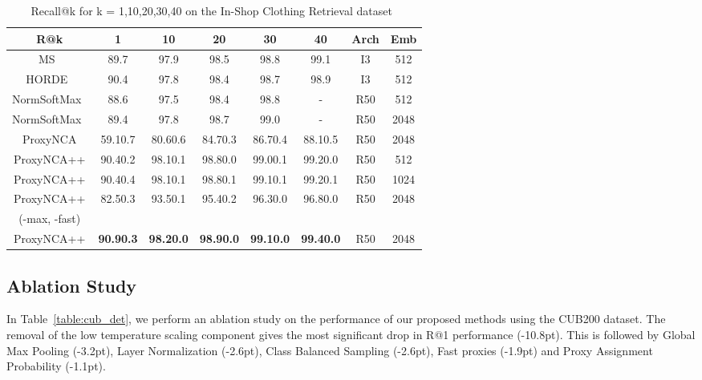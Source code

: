 \documentclass[runningheads]{llncs}
\begin{document}
\begin{table}[htb]
\centering
\caption{Recall@k for k = 1,10,20,30,40 on the In-Shop Clothing Retrieval dataset~\cite{song2016deep}}
\setlength{\tabcolsep}{2pt}
\begin{tabular}{|*8c|}
\hline
R@k & 1 & 10 & 20 & 30 & 40 &  Arch & Emb \\ \hline
\small{MS~\cite{wang2019multi}}& 89.7 & 97.9 & 98.5 & 98.8 & 99.1 & \small{I3}& \small{512}\\
\small{HORDE~\cite{jacob2019metric}}& 90.4 & 97.8 & 98.4 & 98.7 & 98.9 &  \small{I3}& \small{512}\\
\small{NormSoftMax~\cite{zhai2019}}& 88.6 & 97.5 & 98.4 & 98.8 & -  & \small{R50}& \small{512}\\
\small{NormSoftMax~\cite{zhai2019}}& 89.4 & 97.8 & 98.7 & 99.0 & -  & \small{R50}& \small{2048}\\
\hline
\small{ProxyNCA}& 59.10.7 & 80.60.6 &  84.70.3 & 86.70.4 & 88.10.5  & \small{R50}& \small{2048}\\
\small{ProxyNCA++}& 90.40.2 & 98.10.1  &  98.80.0 & 99.00.1 & 99.20.0  & \small{R50}& \small{512}\\
\small{ProxyNCA++}& 90.40.4 & 98.10.1 &  98.80.1 & 99.10.1 & 99.20.1  & \small{R50}& \small{1024}\\
\small{ProxyNCA++}& 82.50.3 & 93.50.1 &  95.40.2 & 96.30.0 & 96.80.0  & \small{R50}& \small{2048}\\
\small{(-max, -fast)}&  &  &   &  & &  & \\
\small{ProxyNCA++}& \textbf{90.90.3} & \textbf{98.20.0} &  \textbf{98.90.0} & \textbf{99.10.0}& \textbf{99.40.0} & \small{R50}& \small{2048}\\
\hline
\end{tabular}
\label{table:inshop}
\end{table}

\subsection{Ablation Study}\label{sec:ablation}

In Table~\ref{table:cub_det}, we perform an ablation study on the performance of our proposed methods using the CUB200 dataset. The removal of the low temperature scaling component gives the most significant drop in R@1 performance (-10.8pt). This is followed by Global Max Pooling (-3.2pt), Layer Normalization (-2.6pt), Class Balanced Sampling (-2.6pt), Fast proxies (-1.9pt) and Proxy Assignment Probability (-1.1pt).
\end{document}
